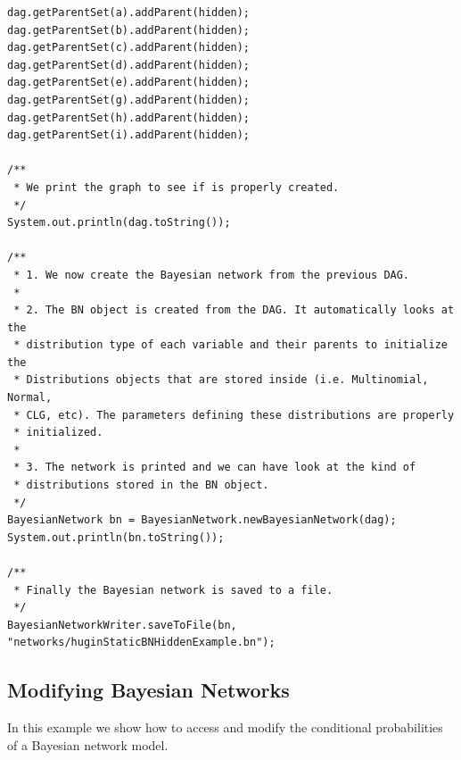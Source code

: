 \begin{lstlisting}
dag.getParentSet(a).addParent(hidden);
dag.getParentSet(b).addParent(hidden);
dag.getParentSet(c).addParent(hidden);
dag.getParentSet(d).addParent(hidden);
dag.getParentSet(e).addParent(hidden);
dag.getParentSet(g).addParent(hidden);
dag.getParentSet(h).addParent(hidden);
dag.getParentSet(i).addParent(hidden);

/**
 * We print the graph to see if is properly created.
 */
System.out.println(dag.toString());

/**
 * 1. We now create the Bayesian network from the previous DAG.
 *
 * 2. The BN object is created from the DAG. It automatically looks at the 
 * distribution type of each variable and their parents to initialize the 
 * Distributions objects that are stored inside (i.e. Multinomial, Normal, 
 * CLG, etc). The parameters defining these distributions are properly 
 * initialized.
 *
 * 3. The network is printed and we can have look at the kind of 
 * distributions stored in the BN object.
 */
BayesianNetwork bn = BayesianNetwork.newBayesianNetwork(dag);
System.out.println(bn.toString());

/**
 * Finally the Bayesian network is saved to a file.
 */
BayesianNetworkWriter.saveToFile(bn, "networks/huginStaticBNHiddenExample.bn");

\end{lstlisting}

\subsection{Modifying Bayesian Networks}

In this example we show how to access and modify the conditional probabilities of a Bayesian network model.

